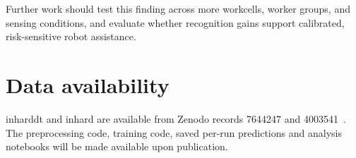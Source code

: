 \documentclass[Royal,sagev,times]{sagej}
\begin{document}
Further work
should test this finding across more workcells, worker groups, and sensing
conditions, and evaluate whether recognition gains support calibrated,
risk-sensitive robot assistance.

\section*{Data availability}

\ac{inharddt} and \ac{inhard} are available from Zenodo records 7644247 and
4003541~\cite{dallel2023dataset,dallel2020inhard}. The preprocessing code,
training code, saved per-run predictions and analysis notebooks will be made
available upon publication.



\end{document}
